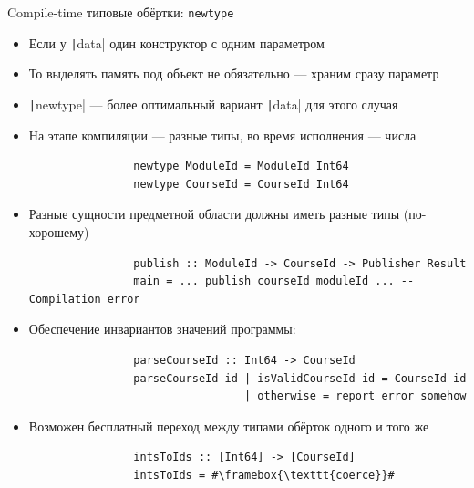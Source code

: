     \begin{frame}[fragile]{Compile-time типовые обёртки: \texttt{newtype}}
        \vspace{-0.5em}
        \begin{itemize}
            \item Если у \texttt|data| один конструктор с одним параметром
            \item[\then] То выделять память под объект не обязательно --- храним сразу параметр
            \item[\defi] \texttt|newtype| --- более оптимальный вариант \texttt|data| для этого случая
            \item[\eg] На этапе компиляции --- разные типы, во время исполнения --- числа
            \begin{verbatim}
                newtype ModuleId = ModuleId Int64
                newtype CourseId = CourseId Int64
            \end{verbatim}
            \item[\practical] Разные сущности предметной области должны иметь разные типы (по-хорошему)
            \begin{verbatim}
                publish :: ModuleId -> CourseId -> Publisher Result
                main = ... publish courseId moduleId ... -- Compilation error
            \end{verbatim}
            \item[\practical] Обеспечение инвариантов значений программы:
            \begin{verbatim}
                parseCourseId :: Int64 -> CourseId
                parseCourseId id | isValidCourseId id = CourseId id
                                 | otherwise = report error somehow
            \end{verbatim}
            \item[\practical] Возможен бесплатный переход между типами обёрток одного и того же
            \begin{verbatim}
                intsToIds :: [Int64] -> [CourseId]
                intsToIds = #\framebox{\texttt{coerce}}#
            \end{verbatim}
        \end{itemize}
    \end{frame}

